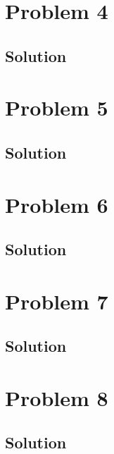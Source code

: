 \documentclass[12pt]{article}
\begin{document}
\pagebreak

\section{Problem 4}

\subsection{Solution}


\pagebreak

\section{Problem 5}

\subsection{Solution}


\pagebreak

\section{Problem 6}

\subsection{Solution}


\pagebreak

\section{Problem 7}

\subsection{Solution}


\pagebreak

\section{Problem 8}

\subsection{Solution}
\end{document}
